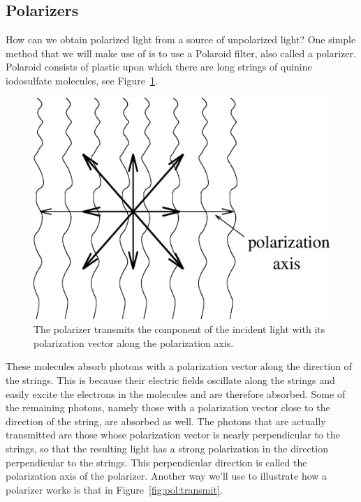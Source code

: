 \subsection{Polarizers}

How can we obtain polarized light from a source of unpolarized light? One
simple method that we will make use of is to use a Polaroid filter, also called
a polarizer.  Polaroid consists of plastic upon which there are long strings of
quinine iodosulfate molecules, see Figure~\ref{fig:pol:polaroid}.
\begin{figure}
\centering 
\epsfxsize=6cm \includegraphics[scale=0.6]{7_polarization/polaroid.eps}
\caption{The polarizer transmits the component of the incident light with its 
polarization vector along the polarization axis.}
\label{fig:pol:polaroid}
\end{figure}
These molecules absorb photons with a polarization vector along the direction 
of the strings. This is because their electric fields oscillate along the 
strings and easily excite the electrons in the molecules and are therefore 
absorbed.  Some of the remaining photons, namely those with a polarization 
vector close to the direction of the string, are absorbed as well. The photons 
that are actually transmitted are those whose polarization vector is nearly 
perpendicular to the strings, so that the resulting light has a strong 
polarization in the direction perpendicular to the strings. This perpendicular 
direction is called the polarization axis of the polarizer. Another way we'll 
use to illustrate how a polarizer works is that in 
Figure~\ref{fig:pol:transmit}.
